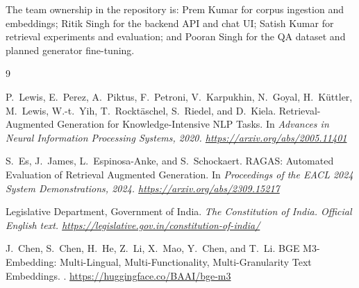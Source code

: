 \documentclass[11pt]{article}
\begin{document}
The team ownership in the repository is: Prem Kumar for corpus ingestion and embeddings; Ritik Singh for the backend API and chat UI; Satish Kumar for retrieval experiments and evaluation; and Pooran Singh for the QA dataset and planned generator fine-tuning.

\begin{thebibliography}{9}

P.~Lewis, E.~Perez, A.~Piktus, F.~Petroni, V.~Karpukhin, N.~Goyal,
H.~K\"uttler, M.~Lewis, W.-t.\ Yih, T.~Rockt\"aschel, S.~Riedel, and
D.~Kiela.
\newblock Retrieval-Augmented Generation for Knowledge-Intensive NLP Tasks.
\newblock In \em{Advances in Neural Information Processing Systems},
2020.
\newblock \url{https://arxiv.org/abs/2005.11401}

S.~Es, J.~James, L.~Espinosa-Anke, and S.~Schockaert.
\newblock RAGAS: Automated Evaluation of Retrieval Augmented Generation.
\newblock In \em{Proceedings of the EACL 2024 System Demonstrations},
2024.
\newblock \url{https://arxiv.org/abs/2309.15217}

Legislative Department, Government of India.
\newblock \em{The Constitution of India}.
\newblock Official English text.
\newblock \url{https://legislative.gov.in/constitution-of-india/}

J.~Chen, S.~Chen, H.~He, Z.~Li, X.~Mao, Y.~Chen, and T.~Li.
\newblock BGE M3-Embedding: Multi-Lingual, Multi-Functionality,
Multi-Granularity Text Embeddings.
.
\newblock \url{https://huggingface.co/BAAI/bge-m3}

\end{thebibliography}
\end{document}
